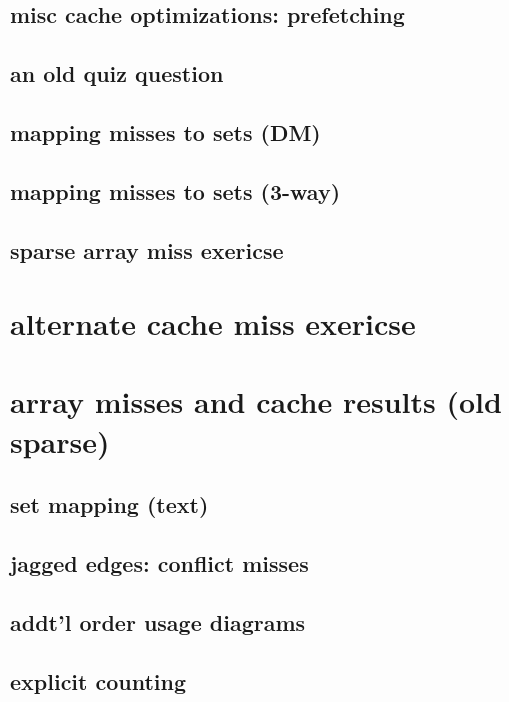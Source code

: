 \subsection{misc cache optimizations: prefetching}


\subsection{an old quiz question}


\subsection{mapping misses to sets (DM)}

\subsection{mapping misses to sets (3-way)}


\subsection{sparse array miss exericse}


\section{alternate cache miss exericse}


\section{array misses and cache results (old sparse)}


\subsection{set mapping (text)}




\subsection{jagged edges: conflict misses} %


\subsection{addt'l order usage diagrams}



\subsection{explicit counting}



